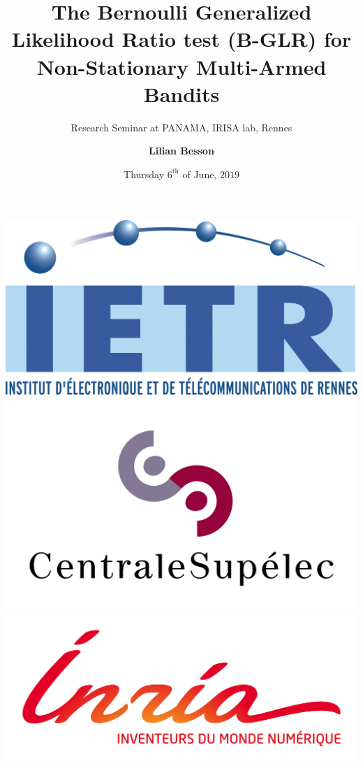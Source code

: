 \documentclass[11pt,english,ignorenonframetext,]{beamer}
\title[B-GLR test and Non-Stationary MAB]{The Bernoulli Generalized Likelihood Ratio test (B-GLR) for Non-Stationary Multi-Armed Bandits}
\subtitle{Research Seminar at PANAMA, IRISA lab, Rennes}
\author[Lilian Besson]{\Large \textbf{Lilian Besson}}
\institute[]{{\large
  PhD Student}{\newline
  \newline SCEE team, IETR laboratory, CentraleSupélec in Rennes
  \newline \& SequeL team, CRIStAL laboratory, Inria in Lille}}
\date{Thursday $6^{\text{th}}$ of June, $2019$}
\begin{document}
\justifying

\begin{frame}[plain]
  \titlepage

  \begin{center}
    \includegraphics[height=0.18\textheight]{../common/LogoIETR.png}
    \includegraphics[height=0.21\textheight]{../common/LogoCS.png}
    \includegraphics[height=0.18\textheight]{../common/LogoInria.jpg}
  \end{center}

\end{frame}
\end{document}
